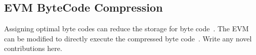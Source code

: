 
\subsection{EVM ByteCode Compression}\label{sec:evmcompress}

Assigning optimal byte codes can reduce the storage for byte code~\cite{aslam2010}. 
The EVM can be modified to directly execute the compressed byte code~\citet{marc2003}.
Write any novel contributions here.


